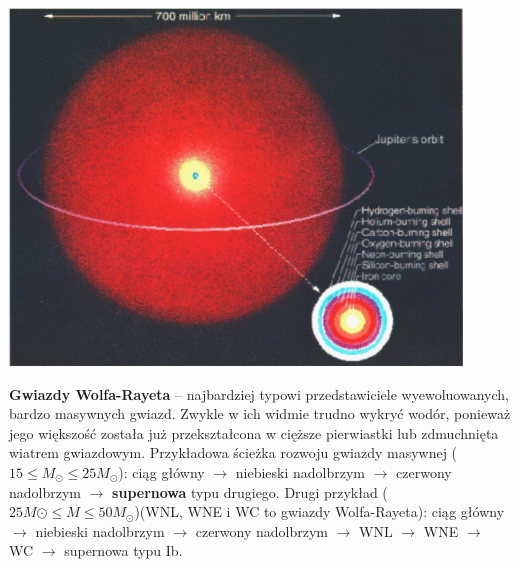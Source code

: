 \documentclass[../index.tex]{subfiles}
\begin{document}
            \begin{center}
                \includegraphics[width=12cm]{images/ogreStar.png}
            \end{center}
            \textbf{Gwiazdy Wolfa-Rayeta} – najbardziej typowi przedstawiciele wyewoluowanych, bardzo masywnych gwiazd. Zwykle w ich widmie trudno wykryć wodór, ponieważ jego większość została już przekształcona w cięższe pierwiastki lub zdmuchnięta wiatrem gwiazdowym. Przykładowa ścieżka rozwoju gwiazdy masywnej (\(15 \leq M_\odot \leq 25M_\odot\)): ciąg główny \(\to \) niebieski nadolbrzym \( \to \) czerwony nadolbrzym \(\to \) \textbf{supernowa} typu drugiego. Drugi przykład (\(25 M\odot \leq  M \leq 50 M_\odot\))(WNL, WNE i WC to gwiazdy Wolfa-Rayeta): ciąg główny \(\to \) niebieski nadolbrzym \( \to \) czerwony nadolbrzym \(\to \) WNL \(\to \) WNE \(\to \) WC \(\to \) supernowa typu Ib.
\end{document}
